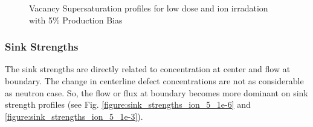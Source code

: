 \documentclass[a4paper]{article}
\begin{document}
\begin{figure}[h!]
        \caption{Vacancy Supersaturation profiles for low dose and ion irradation with 5\% Production Bias}
        \label{figure:vacancy_supersaturation_ion_5}
      \end{figure}
    \subsubsection{Sink Strengths} \hspace{10pt}
    The sink strengths are directly related to concentration at center and flow at boundary. The change in centerline defect concentrations are not as considerable as neutron case. So, the flow or flux at boundary becomes more dominant on sink strength profiles (see Fig. \ref{figure:sink_strengths_ion_5_1e-6} and \ref{figure:sink_strengths_ion_5_1e-3}).
\end{document}
